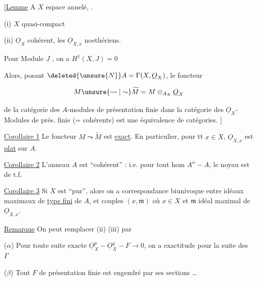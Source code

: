 $\bigl[$\uline{Lemme} A \quad $X$ espace annelé,  .

(i) $X$ quasi-compact

 (ii) $\underline O_X$ cohérent, les $\underline O_{X,x}$ noethériens.

  Pour   Module   $\underline J$ ,  on a $H^1(X,J)=0$  

Alors, posant $\deleted{\unsure{N}}A=\Gamma(X,\underline O_X)$, le foncteur

\[
 M\unsure{\leadsto|\sim}\widetilde M=M\otimes_{A_X}\underline O_X
\]

de la catégorie des $A$-modules de présentation finie dans la catégorie des $\underline O_X$-Modules de prés. finie (= cohérents) est une équivalence de catégories. $\bigr]$


\uline{Corollaire 1} Le foncteur $M\leadsto\widetilde M$ est \uline{exact}. En particulier, pour tt $x\in X$, $\underline O_{X,x}$ est \uline{plat} sur $A$.

\uline{Corollaire 2} L'anneau $A$ est \textquotedblleft cohérent\textquotedblright{} : i.e. pour tout hom $A^n - A$, le noyau est de t.f.

\uline{Corollaire 3} Si $X$ est \textquotedblleft pur\textquotedblright,  alors on a correspondance biunivoque entre idéaux maximaux de \uline{type fini} de $A$, et couples $(x,\mathfrak m)$ où $x\in X$  et $\mathfrak m$ idéal maximal de $\underline O_{X,x}$.

\uline{Remarque} On peut remplacer (ii) (iii) par

($\alpha$) Pour toute suite exacte $\underline O_X^p-\underline O_X^q-F\to0$, on a exactitude pour la suite des $\Gamma$

($\beta$) Tout $F$ de présentation finie est engendré par ses sections \ldots
